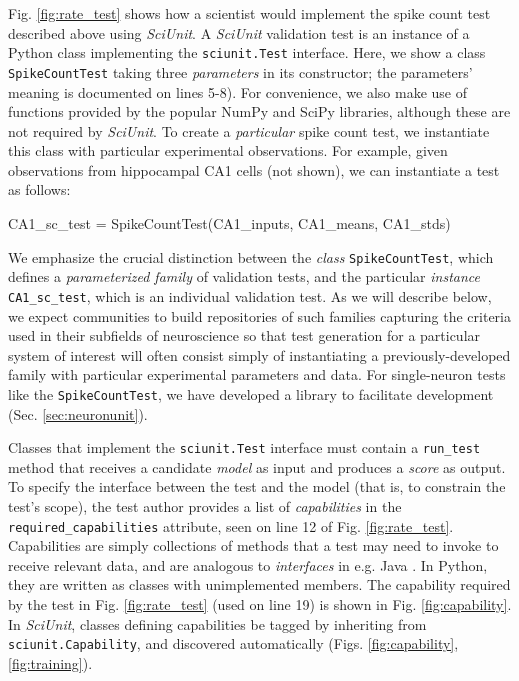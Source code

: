 \documentclass[11pt,letterpaper]{article}
\let\verbx\lstinline
\begin{document}
Fig. \ref{fig:rate_test} shows how a scientist would implement the spike count test described above using \textit{SciUnit}. 
A \textit{SciUnit} validation test is an {instance} of a Python class implementing the \verbx{sciunit.Test} interface. 
Here, we show a class \verbx{SpikeCountTest} taking three \emph{parameters} in its constructor; the parameters' meaning is documented on lines 5-8). 
For convenience, we also make use of functions provided by the popular NumPy\cite{numpy_url} and SciPy\cite{scipy_url} libraries, although these are not required by \textit{SciUnit}.  
To create a \emph{particular} spike count test, we instantiate this class with particular experimental observations. 
For example, given observations from hippocampal CA1 cells (not shown), we can instantiate a test as follows:
\begin{python}
  CA1_sc_test = SpikeCountTest(CA1_inputs, CA1_means, CA1_stds)
\end{python}
We emphasize the crucial distinction between the \textit{class} \verbx{SpikeCountTest}, which defines a \emph{parameterized family} of validation tests, and the particular \textit{instance} \verbx{CA1_sc_test}, which is an individual validation test. 
As we will describe below, we expect communities to build repositories of such families capturing the criteria used in their subfields of neuroscience so that test generation for a particular system of interest will often consist simply of instantiating a previously-developed family with particular experimental parameters and data. 
For single-neuron tests like the \verbx{SpikeCountTest}, we have developed a library \cite{neurounit_url} to facilitate development (Sec. \ref{sec:neuronunit}). 

Classes that implement the \verbx{sciunit.Test} interface must contain a \verbx{run_test} method that receives a candidate \emph{model} as input and produces a \textit{score} as output. 
To specify the interface between the test and the model (that is, to constrain the test's scope), the test author provides a list of \emph{capabilities} in the \verbx{required_capabilities} attribute, seen on line 12 of Fig. \ref{fig:rate_test}. 
Capabilities are simply collections of methods that a test may need to invoke to receive relevant data, and are analogous to \emph{interfaces} in e.g. Java \cite{java_interfaces_url}. 
In Python, they are written as classes with unimplemented members. 
The capability required by the test in Fig. \ref{fig:rate_test} (used on line 19) is shown in Fig. \ref{fig:capability}. 
In \textit{SciUnit}, classes defining capabilities be tagged by inheriting from \verbx{sciunit.Capability}, and discovered automatically (Figs. \ref{fig:capability},\ref{fig:training}). 
\end{document}
